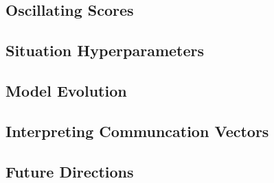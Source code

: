 \documentclass[10pt,twocolumn,letterpaper]{article}
\begin{document}
\subsection{Oscillating Scores}
\subsection{Situation Hyperparameters}
\subsection{Model Evolution}
\subsection{Interpreting Communcation Vectors}
\subsection{Future Directions}


{\small


}
\end{document}
